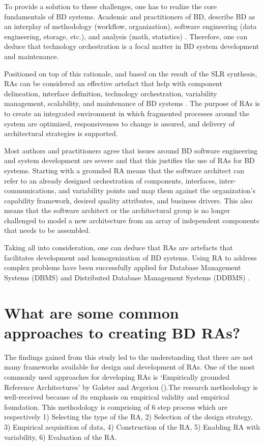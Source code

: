 \documentclass{ieeeaccess}
\begin{document}
To provide a solution to these challenges, one has to realize the core fundamentals of BD systems. Academic and practitioners of BD, describe BD as an interplay of methodology (workflow, organization), software engineering (data engineering, storage, etc.), and analysis (math, statistics) \cite{akhtar2019big}\cite{AtaeiBigDataEnvirons}. Therefore, one can deduce that technology orchestration is a focal matter in BD system development and maintenance.

Positioned on top of this rationale, and based on the result of the SLR synthesis, RAs can be considered an effective artefact that help with component delineation, interface definition, technology orchestration, variability management, scalability, and maintenance of BD systems \cite{Chang}\cite{Nadal}. The purpose of RAs is to create an integrated environment in which fragmented processes around the system are optimized, responsiveness to change is assured, and delivery of architectural strategies is supported. 

Most authors and practitioners agree that issues around BD software engineering and system development are severe and that this justifies the use of RAs for BD systems. Starting with a grounded RA means that the software architect can refer to an already designed orchestration of components, interfaces, inter-communications, and variability points and map them against the organization’s capability framework, desired quality attributes, and business drivers. This also means that the software architect or the architectural group is no longer challenged to model a new architecture from an array of independent components that needs to be assembled.

Taking all into consideration, one can deduce that RAs are artefacts that facilitates development and homogenization of BD systems. Using RA to address complex problems have been successfully applied for Database Management Systems (DBMS) \cite{pineiro2019big} and Distributed Database Management Systems (DDBMS) \cite{rahimi2010distributed}.

\section{What are some common approaches to creating BD RAs?}

The findings gained from this study led to the understanding that there are not many frameworks available for design and development of RAs. One of the most commonly used approaches for developing RAs is ‘Empirically grounded Reference Architectures’ by Galster and Avgeriou (\cite{galster2011empirically}).The research methodology is well-received because of its emphasis on empirical validity and empirical foundation. This methodology is comprising of 6 step process which are respectively 1) Selecting the type of the RA, 2) Selection of the design strategy, 3) Empirical acquisition of data, 4) Construction of the RA, 5) Enabling RA with variability, 6) Evaluation of the RA.
\end{document}
